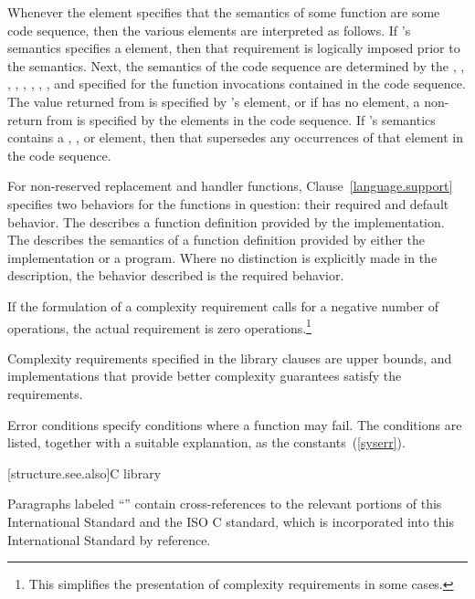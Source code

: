 \pnum
Whenever the \effects element specifies that the semantics of some function
 are  some code sequence, then the various elements are
interpreted as follows. If 's semantics specifies a \requires element, then
that requirement is logically imposed prior to the  semantics.
Next, the semantics of the code sequence are determined by the \requires, \effects,
\postconditions, \returns, \throws, \complexity, \notes, \errors, and \realnotes
specified for the function invocations contained in the code sequence. The value
returned from  is specified by 's \returns element, or if 
has no \returns element, a non- return from  is specified by the
\returns elements in the code sequence. If 's semantics contains a \throws,
\postconditions, or \complexity element, then that supersedes any occurrences of that
element in the code sequence.

\pnum
For non-reserved replacement and handler functions,
Clause~\ref{language.support} specifies two behaviors for the functions in question:
their required and default behavior.
The
describes a function definition provided by the implementation.
%
The
describes the semantics of a function definition provided by
%
either the implementation or a \Cpp program.
Where no distinction is explicitly made in the description, the
behavior described is the required behavior.

\pnum
If the formulation of a complexity requirement calls for a negative number of
operations, the actual requirement is zero operations.\footnote{This simplifies
the presentation of complexity requirements in some cases.}

\pnum
Complexity requirements specified in the library clauses are upper bounds,
and implementations that provide better complexity guarantees satisfy
the requirements.

\pnum
Error conditions specify conditions where a function may fail. The conditions
are listed, together with a suitable explanation, as the 
constants~(\ref{syserr}).

[structure.see.also]{C library}

\pnum
Paragraphs labeled ``\xref'' contain cross-references to the relevant portions
of this International Standard and the ISO C standard,
which is incorporated into this International Standard by reference.


